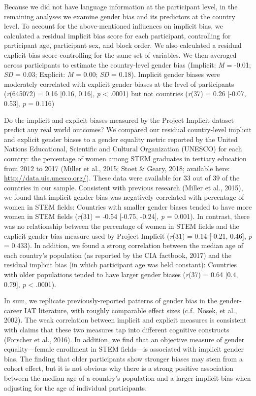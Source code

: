 \documentclass[man,floatsintext]{apa6}
\begin{document}
Because we did not have language information at the participant level, in the remaining analyses we examine gender bias and its predictors at the country level. To account for the above-mentioned influences on implicit bias, we calculated a residual implicit bias score for each participant, controlling for participant age, participant sex, and block order. We also calculated a residual explicit bias score controlling for the same set of variables. We then averaged across participants to estimate the country-level gender bias (Implicit: \emph{M} = -0.01; \emph{SD} = 0.03; Explicit: \emph{M} = 0.00; \emph{SD} = 0.18). Implicit gender biases were moderately correlated with explicit gender biases at the level of participants
(\emph{r}(645072) = 0.16 {[}0.16, 0.16{]}, \emph{p} \textless{} .0001) but not countries (\emph{r}(37) = 0.26 {[}-0.07, 0.53{]}, \emph{p} = 0.116)

Do the implicit and explicit biases measured by the Project Implicit dataset predict any real world outcomes? We compared our residual country-level implicit and explicit gender biases to a gender equality metric reported by the United Nations Educational, Scientific and Cultural Organization (UNESCO) for each country: the percentage of women among STEM graduates in tertiary education from 2012 to 2017 (Miller et al., 2015; Stoet \& Geary, 2018; available here: \url{http://data.uis.unesco.org/}). These data were available for 33 out of 39 of the countries in our sample. Consistent with previous research (Miller et al., 2015), we found that implicit gender bias was negatively correlated with percentage of women in STEM fields: Countries with smaller gender biases tended to have more women in STEM fields (\emph{r}(31) = -0.54 {[}-0.75, -0.24{]}, \emph{p} = 0.001). In contrast, there was no relationship between the percentage of women in STEM fields and the explicit gender bias measure used by Project Implicit (\emph{r}(31) = 0.14 {[}-0.21, 0.46{]}, \emph{p} = 0.433). In addition, we found a strong correlation between the median age of each country's population (as reported by the CIA factbook, 2017) and the residual implicit bias (in which participant age was held constant): Countries with older populations tended to have larger gender biases (\emph{r}(37) = 0.64 {[}0.4, 0.79{]}, \emph{p} \textless{} .0001).

In sum, we replicate previously-reported patterns of gender bias in the gender-career IAT literature, with roughly comparable effect sizes (c.f.~Nosek, et al., 2002). The weak correlation between implicit and explicit measures is consistent with claims that these two measures tap into different cognitive constructs (Forscher et al., 2016). In addition, we find that an objective measure of gender equality---female enrollment in STEM fields---is associated with implicit gender bias. The finding that older participants show stronger biases may stem from a cohort effect, but it is not obvious why there is a strong positive association between the median age of a country's population and a larger implicit bias when adjusting for the age of individual participants.
\end{document}
